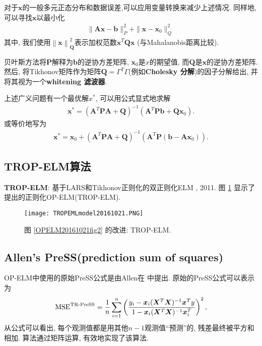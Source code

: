 对于$\bm x$的一般多元正态分布和数据误差,可以应用变量转换来减少上述情况. 同样地, 可以寻找$\bm x$以最小化
\begin{align}
    \|\bm A\bm x-\bm b\|_{P}^{2}+\|\bm x-\bm x_{0}\|_{Q}^{2}\,
\end{align}
其中, 我们使用$\left\|\bm x\right\|_{\bm Q}^{2}$表示加权范数$\bm x^{T}\bm Q\bm x$ (与Mahalanobis距离比较).

\begin{remark}
贝叶斯方法将$\bm P$解释为$\bm b$的逆协方差矩阵, $\bm x_0$是$x$的期望值, 而$\bm Q$是$\bm x$的逆协方差矩阵.
然后, 将Tikhonov矩阵作为矩阵$\displaystyle\bm Q=\Gamma^{T}\Gamma$(例如\textbf{Cholesky 分解})的因子分解给出, 并将其视为一个\textbf{whitening 滤波器}.
\end{remark}

上述广义问题有一个最优解$x^{*}$, 可以用公式显式地求解
\begin{align}
    \bm x^{*}=(\bm A^{T}\bm P\bm A+\bm Q)^{-1}(\bm A^{T}\bm P\bm b+\bm Q\bm x_{0}).
\end{align}
或等价地写为
\begin{align}
    \bm x^{*}=\bm x_{0}+(\bm A^{T}\bm P\bm A+\bm Q)^{-1}(\bm A^{T}\bm P(\bm b-\bm A \bm x_{0})).
\end{align}
\subsection{TROP-ELM算法}
\textbf{TROP-ELM}: 基于LARS和Tikhonov正则化的双正则化ELM \cite{MichevanHeeswijk2011-30641}, 2011.
图 \ref{TROPEMLmodel20161021fig2} 显示了提出的正则化OP-ELM(TROP-ELM).
\begin{figure}[H]
    \begin{center}
    \texttt{[image: TROPEMLmodel20161021.PNG]}
    \end{center}
    \caption{图 \ref{OPELM20161021fig2} 的改进: TROP-ELM.}
    \label{TROPEMLmodel20161021fig2}
\end{figure}
\subsection{Allen's PreSS(prediction sum of squares)}
OP-ELM中使用的原始PreSS公式是由Allen在 \cite{MADavid1972} 中提出. 原始的PreSS公式可以表示为
\begin{align}\label{AIC5eqn519}
  \textup{MSE}^{\textup{TR-PreSS}}=\frac 1 n \sum_{i=1}^n \left( \frac{y_i-\bm x_i(\bm X^T \bm X)^{-1}\bm x^T y}
       {1-\bm x_i(\bm X^T \bm X)^{-1}\bm x_i^T}\right)^2,
\end{align}
从公式可以看出, 每个观测值都是用其他$n-1$观测值“预测”的, 残差最终被平方和相加. 算法通过矩阵运算, 有效地实现了该算法.

